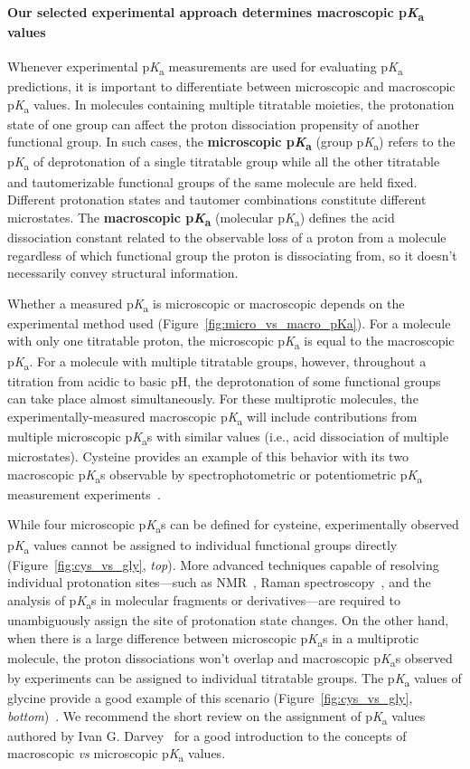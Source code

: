 \documentclass[9pt,lineno]{elife}
\newcommand{\pKa}{p\textit{K}\textsubscript{a}}
\begin{document}
\paragraph{Our selected experimental approach determines macroscopic \pKa{} values}

Whenever experimental \pKa{} measurements are used for evaluating \pKa{} predictions, it is important to differentiate between microscopic and macroscopic \pKa{} values. 
In molecules containing multiple titratable moieties, the protonation state of one group can affect the proton dissociation propensity of another functional group.
In such cases, the \textbf{microscopic \pKa} (group \pKa) refers to the \pKa{} of deprotonation of a single titratable group while all the other titratable and tautomerizable functional groups of the same molecule are held fixed. 
Different protonation states and tautomer combinations constitute different microstates. 
The \textbf{macroscopic \pKa} (molecular \pKa) defines the acid dissociation constant related to the observable loss of a proton from a molecule regardless of which functional group the proton is dissociating from, so it doesn't necessarily convey structural information. 

Whether a measured \pKa{} is microscopic or macroscopic depends on the experimental method used (Figure~\ref{fig:micro_vs_macro_pKa}). 
For a molecule with only one titratable proton, the microscopic \pKa{} is equal to the macroscopic \pKa{}. 
For a molecule with multiple titratable groups, however, throughout a titration from acidic to basic pH, the deprotonation of some functional groups can take place almost simultaneously. 
For these multiprotic molecules, the experimentally-measured macroscopic \pKa{} will include contributions from multiple microscopic \pKa{}s with similar values (i.e., acid dissociation of multiple microstates). 
Cysteine provides an example of this behavior with its two macroscopic \pKa{}s observable by spectrophotometric or potentiometric \pKa{} measurement experiments~\citep{bodner_assigning_1986,darvey_assignment_1995}. 

While four microscopic \pKa{}s can be defined for cysteine, experimentally observed \pKa{} values cannot be assigned to individual functional groups directly (Figure~\ref{fig:cys_vs_gly}, \emph{top}). More advanced techniques capable of resolving individual protonation sites---such as NMR~\citep{bezencon_pka_2014}, Raman spectroscopy~\citep{elson_raman_1962, elbagerma_raman_2011}, and the analysis of \pKa{}s in molecular fragments or derivatives---are required to unambiguously assign the site of protonation state changes. 
On the other hand, when there is a large difference between microscopic \pKa{}s in a multiprotic molecule, the proton dissociations won't overlap and macroscopic \pKa{}s observed by experiments can be assigned to individual titratable groups. 
The \pKa{} values of glycine provide a good example of this scenario (Figure~\ref{fig:cys_vs_gly}, \emph{bottom})~\citep{bodner_assigning_1986,elson_raman_1962,darvey_assignment_1995}. 
We recommend the short review on the assignment of \pKa{} values authored by Ivan G. Darvey~\citep{darvey_assignment_1995} for a good introduction to the concepts of macroscopic \emph{vs} microscopic \pKa{} values.
\end{document}
